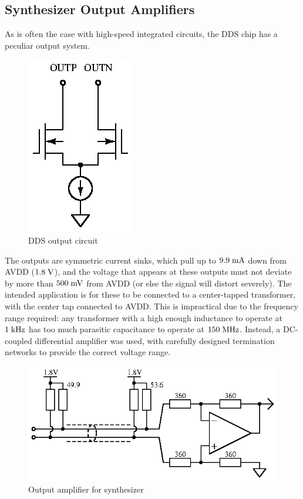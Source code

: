\subsection{Synthesizer Output Amplifiers}

As is often the case with high-speed integrated circuits, the DDS chip has a
peculiar output system.

\begin{figure}[H]
\centering
\includegraphics{dds-output}
\caption{DDS output circuit}
\label{fig:ddsoutput}
\end{figure}

The outputs are symmetric current sinks, which pull up to $9.9\;\mathrm{mA}$
down from AVDD ($1.8\;\mathrm{V}$), and the voltage that appears at these
outputs must not deviate by more than $500\;\mathrm{mV}$ from AVDD (or else
the signal will distort severely). The intended application is for these
to be connected to a center-tapped transformer, with the center tap connected
to AVDD. This is impractical due to the frequency range required: any
transformer with a high enough inductance to operate at $1\;\mathrm{kHz}$ has
too much parasitic capacitance to operate at $150\;\mathrm{MHz}$. Instead,
a DC-coupled differential amplifier was used, with carefully designed
termination networks to provide the correct voltage range.

\begin{figure}[H]
\centering
\includegraphics{dds-outamp}
\caption{Output amplifier for synthesizer}
\label{fig:synthoutput}
\end{figure}

